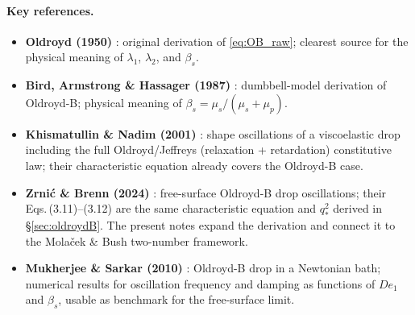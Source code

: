 \paragraph{Key references.}
\begin{itemize}
  \item \textbf{Oldroyd (1950)} \cite{oldroyd1950}: original derivation of
        \eqref{eq:OB_raw}; clearest source for the physical meaning of
        $\lambda_1$, $\lambda_2$, and $\beta_s$.
  \item \textbf{Bird, Armstrong \& Hassager (1987)} \cite{bird1987}:
        dumbbell-model derivation of Oldroyd-B; physical meaning of
        $\beta_s = \mu_s/(\mu_s+\mu_p)$.
  \item \textbf{Khismatullin \& Nadim (2001)} \cite{khismatullin2001}:
        shape oscillations of a viscoelastic drop including the full
        Oldroyd/Jeffreys (relaxation + retardation) constitutive law;
        their characteristic equation already covers the Oldroyd-B case.
  \item \textbf{Zrni\'{c} \& Brenn (2024)} \cite{zirnic2024}:
        free-surface Oldroyd-B drop oscillations; their Eqs.\,(3.11)--(3.12)
        are the same characteristic equation and $q_*^2$ derived in \S\ref{sec:oldroydB}.
        The present notes expand the derivation and connect it to the
        Mola\v{c}ek \& Bush two-number framework.
  \item \textbf{Mukherjee \& Sarkar (2010)} \cite{mukherjee2009}:
        Oldroyd-B drop in a Newtonian bath; numerical results for
        oscillation frequency and damping as functions of $De_1$ and
        $\beta_s$, usable as benchmark for the free-surface limit.
\end{itemize}
